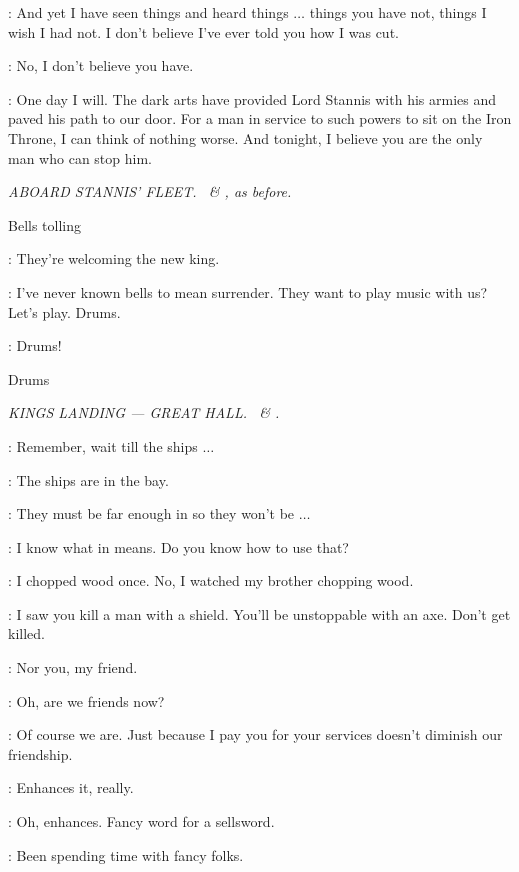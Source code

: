 \VARYS: And yet I have seen things and heard things $\ldots$  things you have not, things I wish I had not. I don't believe I've ever told you how I was cut. 

\TYRION: No, I don't believe you have. 

\VARYS: One day I will. The dark arts have provided Lord Stannis with his armies and paved his path to our door. For a man in service to such powers to sit on the Iron Throne, I can think of nothing worse. And tonight, I believe you are the only man who can stop him. 


\scene

\textit{ABOARD STANNIS' FLEET. \MATTHOS ~\& \DAVOS, as before.} 

\sfx Bells tolling

\MATTHOS: They're welcoming the new king. 

\DAVOS: I've never known bells to mean surrender. They want to play music with us? Let's play. Drums. 

\MATTHOS:  Drums! 

\sfx Drums


\scene

\textit{KINGS LANDING --- GREAT HALL. \TYRION ~\& \BRONN.} 

\TYRION: Remember, wait till the ships $\ldots$  

\BRONN: The ships are in the bay. 

\TYRION: They must be far enough in so they won't be $\ldots$  

\BRONN: I know what in means. Do you know how to use that? 

\TYRION: I chopped wood once. No, I watched my brother chopping wood. 

\BRONN: I saw you kill a man with a shield. You'll be unstoppable with an axe. Don't get killed. 

\TYRION: Nor you, my friend. 

\BRONN: Oh, are we friends now? 

\TYRION: Of course we are. Just because I pay you for your services doesn't diminish our friendship. 

\BRONN: Enhances it, really. 

\TYRION: Oh, enhances. Fancy word for a sellsword. 

\BRONN: Been spending time with fancy folks. 


